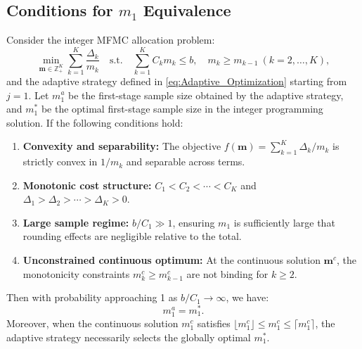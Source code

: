 \subsection{Conditions for $m_1$ Equivalence}
\begin{theorem}
\label{thm:first_stage_optimality}
Consider the integer MFMC allocation problem:
\[
\min_{\mathbf{m} \in \mathbb{Z}_+^K} \sum_{k=1}^K \frac{\Delta_k}{m_k}
\quad \text{s.t.} \quad 
\sum_{k=1}^K C_k m_k \le b, \quad 
m_k \ge m_{k-1} \ (k=2,\dots,K),
\]
and the adaptive strategy defined in \eqref{eq:Adaptive_Optimization} starting from $j=1$. Let $m_1^a$ be the first-stage sample size obtained by the adaptive strategy, and $m_1^*$ be the optimal first-stage sample size in the integer programming solution. If the following conditions hold:

\begin{enumerate}[label=(C\arabic*)]
    \item \textbf{Convexity and separability:} The objective $f(\mathbf{m}) = \sum_{k=1}^K \Delta_k/m_k$ is strictly convex in $1/m_k$ and separable across terms.
    
    \item \textbf{Monotonic cost structure:} $C_1 < C_2 < \cdots < C_K$ and $\Delta_1 > \Delta_2 > \cdots > \Delta_K > 0$.
    
    \item \textbf{Large sample regime:} $b/C_1 \gg 1$, ensuring $m_1$ is sufficiently large that rounding effects are negligible relative to the total.
    
    \item \textbf{Unconstrained continuous optimum:} At the continuous solution $\mathbf{m}^c$, the monotonicity constraints $m_k^c \ge m_{k-1}^c$ are not binding for $k \ge 2$.
\end{enumerate}

Then with probability approaching 1 as $b/C_1 \to \infty$, we have:
\[
m_1^a = m_1^*.
\]
Moreover, when the continuous solution $m_1^c$ satisfies $\lfloor m_1^c \rfloor \le m_1^c \le \lceil m_1^c \rceil$, the adaptive strategy necessarily selects the globally optimal $m_1^*$.
\end{theorem}


